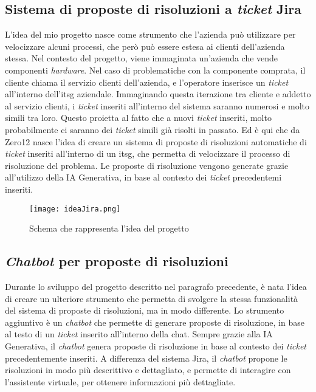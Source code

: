\subsection{Sistema di proposte di risoluzioni a \textit{ticket} Jira} \label{sec:spiegazioneJira}
L'idea del mio progetto nasce come strumento che l'azienda può utilizzare per velocizzare alcuni processi, che però può essere estesa ai clienti dell'azienda stessa. Nel contesto del progetto, viene immaginata un'azienda che vende componenti \textit{hardware}. 
Nel caso di problematiche con la componente comprata, il cliente chiama il servizio clienti dell'azienda, e l'operatore inserisce un \textit{ticket} all'interno dell'\gls{itsg} aziendale. Immaginando questa iterazione tra cliente e addetto al servizio clienti, i \textit{ticket} inseriti all'interno del sistema saranno numerosi e molto simili tra loro. 
Questo proietta al fatto che a nuovi \textit{ticket} inseriti, molto probabilmente ci saranno dei \textit{ticket} simili già risolti in passato. 
Ed è qui che da Zero12 nasce l'idea di creare un sistema di proposte di risoluzioni automatiche di \textit{ticket} inseriti all'interno di un \gls{itsg}, che permetta di velocizzare il processo di risoluzione del problema. Le proposte di risoluzione vengono generate grazie all'utilizzo della IA Generativa, in base al contesto dei \textit{ticket} precedentemi inseriti.

\begin{figure}[H]
    \centering
    \texttt{[image: ideaJira.png]}
    \caption{Schema che rappresenta l'idea del progetto}
    \label{fig:ideaJira}
\end{figure}
\subsection{\textit{Chatbot} per proposte di risoluzioni}
Durante lo sviluppo del progetto descritto nel paragrafo precedente, è nata l'idea di creare un ulteriore strumento che permetta di svolgere la stessa funzionalità del sistema di proposte di risoluzioni, ma in modo differente. Lo strumento aggiuntivo è un \textit{chatbot} che permette di generare proposte di risoluzione, in base al testo di un \textit{ticket} inserito all'interno della chat. 
Sempre grazie alla IA Generativa, il \textit{chatbot} genera proposte di risoluzione in base al contesto dei \textit{ticket} precedentemente inseriti. A differenza del sistema Jira, il \textit{chatbot} propone le risoluzioni in modo più descrittivo e dettagliato, e permette di interagire con l'assistente virtuale, per ottenere informazioni più dettagliate.
